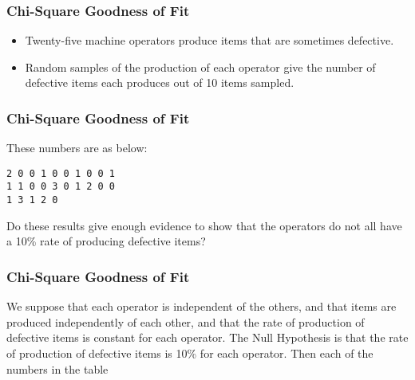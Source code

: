 

\begin{frame}[fragile]
\frametitle{Chi-Square Goodness of Fit}
\begin{itemize}
\item Twenty-five machine operators produce items that are sometimes
defective. 
\item Random samples of the production of each operator give the number of
defective items each produces out of 10 items sampled. 
\end{itemize}
\end{frame}
\begin{frame}[fragile]
\frametitle{Chi-Square Goodness of Fit}
These numbers are as below:
\begin{framed}
\begin{verbatim}
2 0 0 1 0 0 1 0 0 1
1 1 0 0 3 0 1 2 0 0
1 3 1 2 0
\end{verbatim}
\end{framed}


Do these results give enough evidence to show that the operators do not all have a 10\%
rate of producing defective items?

\end{frame}
\begin{frame}[fragile]
	\frametitle{Chi-Square Goodness of Fit}
	
We suppose that each operator is independent of the others, and that items are
produced independently of each other, and that the rate of production of defective
items is constant for each operator. The Null Hypothesis is that the rate of production
of defective items is 10\% for each operator. Then each of the numbers in the table


\end{frame}
